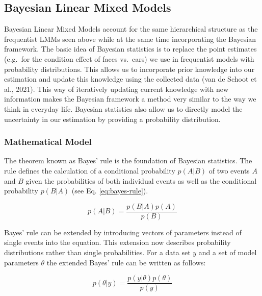 \documentclass[
  doc,12pt,floatsintext]{apa7}
\begin{document}
\subsection{Bayesian Linear Mixed Models}\label{bayesian-linear-mixed-models}

Bayesian Linear Mixed Models account for the same hierarchical structure as the frequentist LMMs seen above while at the same time incorporating the Bayesian framework. The basic idea of Bayesian statistics is to replace the point estimates (e.g.~for the condition effect of faces vs.~cars) we use in frequentist models with probability distributions. This allows us to incorporate prior knowledge into our estimation and update this knowledge using the collected data (van de Schoot et al., 2021). This way of iteratively updating current knowledge with new information makes the Bayesian framework a method very similar to the way we think in everyday life. Bayesian statistics also allow us to directly model the uncertainty in our estimation by providing a probability distribution.

\subsubsection{Mathematical Model}\label{mathematical-model}

The theorem known as Bayes' rule is the foundation of Bayesian statistics. The rule defines the calculation of a conditional probability \(p(A|B)\) of two events \(A\) and \(B\) given the probabilities of both individual events as well as the conditional probability \(p(B|A)\) (see Eq. \eqref{eq:bayes-rule}).

\begin{equation}
p(A|B) = \frac{p(B|A)p(A)}{p(B)}
\label{eq:bayes-rule}
\end{equation}

Bayes' rule can be extended by introducing vectors of parameters instead of single events into the equation. This extension now describes probability distributions rather than single probabilities. For a data set \(y\) and a set of model parameters \(\theta\) the extended Bayes' rule can be written as follows:

\begin{equation}
p(\theta|y) = \frac{p(y|\theta)p(\theta)}{p(y)}
\label{eq:bayes-rule-distributions}
\end{equation}
\end{document}
